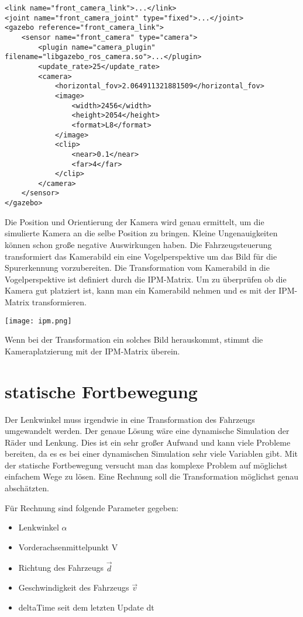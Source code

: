 \begin{lstlisting}
<link name="front_camera_link">...</link>
<joint name="front_camera_joint" type="fixed">...</joint>
<gazebo reference="front_camera_link">
    <sensor name="front_camera" type="camera">
        <plugin name="camera_plugin" filename="libgazebo_ros_camera.so">...</plugin>
        <update_rate>25</update_rate>
        <camera>
            <horizontal_fov>2.064911321881509</horizontal_fov>
            <image>
                <width>2456</width>
                <height>2054</height>
                <format>L8</format>
            </image>
            <clip>
                <near>0.1</near>
                <far>4</far>
            </clip>
        </camera>
    </sensor>
</gazebo>
\end{lstlisting}
Die Position und Orientierung der Kamera wird genau ermittelt, um die simulierte Kamera an die selbe Position zu bringen.
Kleine Ungenauigkeiten können schon große negative Auswirkungen haben. 
Die Fahrzeugsteuerung transformiert das Kamerabild ein eine Vogelperspektive um das Bild für die Spurerkennung vorzubereiten.
Die Transformation vom Kamerabild in die Vogelperspektive ist definiert durch die IPM-Matrix.
Um zu überprüfen ob die Kamera gut platziert ist, kann man ein Kamerabild nehmen und es mit der IPM-Matrix transformieren. 
\begin{center}
    \texttt{[image: ipm.png]}
\end{center}
Wenn bei der Transformation ein solches Bild herauskommt, stimmt die Kameraplatzierung mit der IPM-Matrix überein.



\section{statische Fortbewegung}
Der Lenkwinkel muss irgendwie in eine Transformation des Fahrzeugs umgewandelt werden.
Der genaue Lösung wäre eine dynamische Simulation der Räder und Lenkung.
Dies ist ein sehr großer Aufwand und kann viele Probleme bereiten, da es es bei einer dynamischen Simulation sehr viele Variablen gibt.
Mit der statische Fortbewegung versucht man das komplexe Problem auf möglichst einfachem Wege zu lösen. 
Eine Rechnung soll die Transformation möglichst genau abschätzten. 

Für Rechnung sind folgende Parameter gegeben:
\begin{itemize}
    \item[] Lenkwinkel $\alpha$
    \item[] Vorderachsenmittelpunkt V
    \item[] Richtung des Fahrzeugs $\vec{d}$
    \item[] Geschwindigkeit des Fahrzeugs $\vec{v}$
    \item[] deltaTime seit dem letzten Update dt
\end{itemize}

